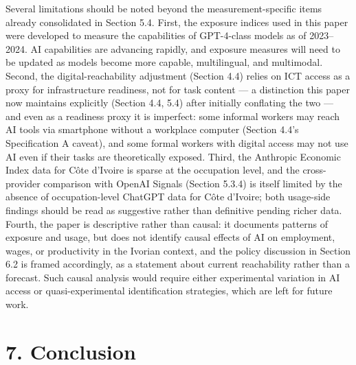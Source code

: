 \documentclass[
  11pt,
]{article}
\begin{document}
Several limitations should be noted beyond the measurement-specific
items already consolidated in Section 5.4. First, the exposure indices
used in this paper were developed to measure the capabilities of
GPT-4-class models as of 2023--2024. AI capabilities are advancing
rapidly, and exposure measures will need to be updated as models become
more capable, multilingual, and multimodal. Second, the
digital-reachability adjustment (Section 4.4) relies on ICT access as a
proxy for infrastructure readiness, not for task content --- a
distinction this paper now maintains explicitly (Section 4.4, 5.4) after
initially conflating the two --- and even as a readiness proxy it is
imperfect: some informal workers may reach AI tools via smartphone
without a workplace computer (Section 4.4's Specification A caveat), and
some formal workers with digital access may not use AI even if their
tasks are theoretically exposed. Third, the Anthropic Economic Index
data for Côte d'Ivoire is sparse at the occupation level, and the
cross-provider comparison with OpenAI Signals (Section 5.3.4) is itself
limited by the absence of occupation-level ChatGPT data for Côte
d'Ivoire; both usage-side findings should be read as suggestive rather
than definitive pending richer data. Fourth, the paper is descriptive
rather than causal: it documents patterns of exposure and usage, but
does not identify causal effects of AI on employment, wages, or
productivity in the Ivorian context, and the policy discussion in
Section 6.2 is framed accordingly, as a statement about current
reachability rather than a forecast. Such causal analysis would require
either experimental variation in AI access or quasi-experimental
identification strategies, which are left for future work.

\section{7. Conclusion}\label{conclusion}
\end{document}
